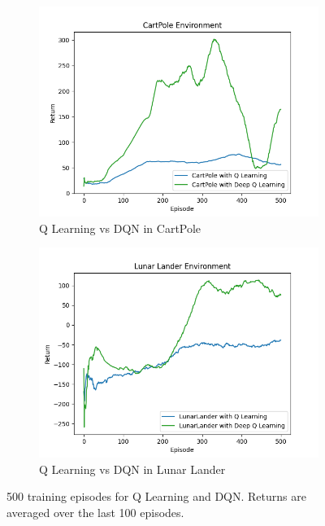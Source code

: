 \documentclass{article}
\begin{document}
\begin{figure}[H]
      \centering
      \begin{subfigure}[H]{0.49\textwidth}
            \centering
            \includegraphics[width=\textwidth]{cartpole}
            \caption{Q Learning vs DQN in CartPole}
            \label{fig:cartpole}
      \end{subfigure}
      \begin{subfigure}[H]{0.49\textwidth}
            \centering
            \includegraphics[width=\textwidth]{lunar}
            \caption{Q Learning vs DQN in Lunar Lander}
            \label{fig:lunar}
      \end{subfigure}
      \caption{500 training episodes for Q Learning and DQN. Returns are averaged over the last 100 episodes.}
      \label{fig:train}
\end{figure}
\end{document}
